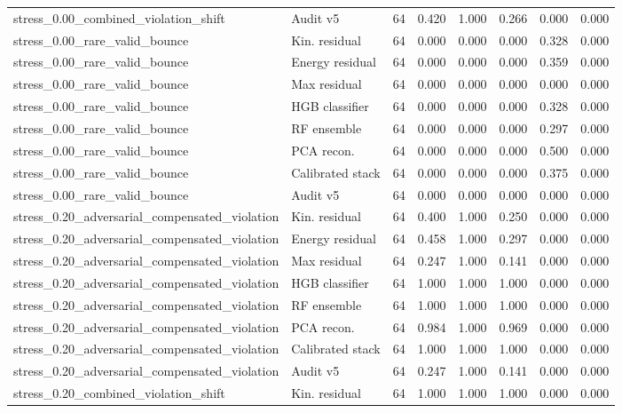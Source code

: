 {\begin{longtable}{llrrrrrr}
stress\_0.00\_combined\_violation\_shift & Audit v5 & 64 & 0.420 & 1.000 & 0.266 & 0.000 & 0.000 \\
stress\_0.00\_rare\_valid\_bounce & Kin. residual & 64 & 0.000 & 0.000 & 0.000 & 0.328 & 0.000 \\
stress\_0.00\_rare\_valid\_bounce & Energy residual & 64 & 0.000 & 0.000 & 0.000 & 0.359 & 0.000 \\
stress\_0.00\_rare\_valid\_bounce & Max residual & 64 & 0.000 & 0.000 & 0.000 & 0.000 & 0.000 \\
stress\_0.00\_rare\_valid\_bounce & HGB classifier & 64 & 0.000 & 0.000 & 0.000 & 0.328 & 0.000 \\
stress\_0.00\_rare\_valid\_bounce & RF ensemble & 64 & 0.000 & 0.000 & 0.000 & 0.297 & 0.000 \\
stress\_0.00\_rare\_valid\_bounce & PCA recon. & 64 & 0.000 & 0.000 & 0.000 & 0.500 & 0.000 \\
stress\_0.00\_rare\_valid\_bounce & Calibrated stack & 64 & 0.000 & 0.000 & 0.000 & 0.375 & 0.000 \\
stress\_0.00\_rare\_valid\_bounce & Audit v5 & 64 & 0.000 & 0.000 & 0.000 & 0.000 & 0.000 \\
stress\_0.20\_adversarial\_compensated\_violation & Kin. residual & 64 & 0.400 & 1.000 & 0.250 & 0.000 & 0.000 \\
stress\_0.20\_adversarial\_compensated\_violation & Energy residual & 64 & 0.458 & 1.000 & 0.297 & 0.000 & 0.000 \\
stress\_0.20\_adversarial\_compensated\_violation & Max residual & 64 & 0.247 & 1.000 & 0.141 & 0.000 & 0.000 \\
stress\_0.20\_adversarial\_compensated\_violation & HGB classifier & 64 & 1.000 & 1.000 & 1.000 & 0.000 & 0.000 \\
stress\_0.20\_adversarial\_compensated\_violation & RF ensemble & 64 & 1.000 & 1.000 & 1.000 & 0.000 & 0.000 \\
stress\_0.20\_adversarial\_compensated\_violation & PCA recon. & 64 & 0.984 & 1.000 & 0.969 & 0.000 & 0.000 \\
stress\_0.20\_adversarial\_compensated\_violation & Calibrated stack & 64 & 1.000 & 1.000 & 1.000 & 0.000 & 0.000 \\
stress\_0.20\_adversarial\_compensated\_violation & Audit v5 & 64 & 0.247 & 1.000 & 0.141 & 0.000 & 0.000 \\
stress\_0.20\_combined\_violation\_shift & Kin. residual & 64 & 1.000 & 1.000 & 1.000 & 0.000 & 0.000 \\

\end{longtable}}
